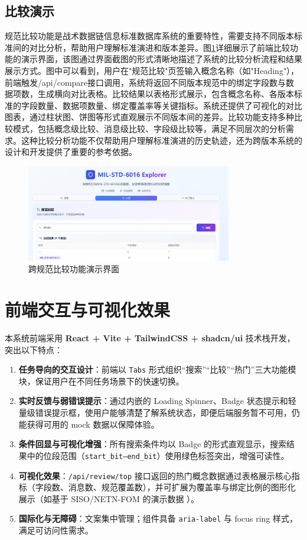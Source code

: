 \subsection{比较演示}
规范比较功能是战术数据链信息标准数据库系统的重要特性，需要支持不同版本标准间的对比分析，帮助用户理解标准演进和版本差异。图\ref{fig:compare-demo}详细展示了前端比较功能的演示界面，该图通过界面截图的形式清晰地描述了系统的比较分析流程和结果展示方式。图中可以看到，用户在"规范比较"页签输入概念名称（如"Heading"），前端触发/api/compare接口调用，系统将返回不同版本规范中的绑定字段数与数据项数，生成横向对比表格。比较结果以表格形式展示，包含概念名称、各版本标准的字段数量、数据项数量、绑定覆盖率等关键指标。系统还提供了可视化的对比图表，通过柱状图、饼图等形式直观展示不同版本间的差异。比较功能支持多种比较模式，包括概念级比较、消息级比较、字段级比较等，满足不同层次的分析需求。这种比较分析功能不仅帮助用户理解标准演进的历史轨迹，还为跨版本系统的设计和开发提供了重要的参考依据。

\begin{figure}[H]
  \centering
  \includegraphics[width=0.8\textwidth]{chapters/fig-0/frontend-compare-demo.png}
  \caption{跨规范比较功能演示界面}
  \label{fig:compare-demo}
\end{figure}


\section{前端交互与可视化效果}

本系统前端采用 \textbf{React + Vite + TailwindCSS + shadcn/ui} 技术栈开发，突出以下特点：
\begin{enumerate}
  \item \textbf{任务导向的交互设计}：前端以 \texttt{Tabs} 形式组织“搜索”“比较”“热门”三大功能模块，保证用户在不同任务场景下的快速切换。
  \item \textbf{实时反馈与弱错误提示}：通过内嵌的 Loading Spinner、Badge 状态提示和轻量级错误提示框，使用户能够清楚了解系统状态，即便后端服务暂不可用，仍能获得可用的 mock 数据以保障体验。
  \item \textbf{条件回显与可视化增强}：所有搜索条件均以 Badge 的形式直观显示，搜索结果中的位段范围（\texttt{start\_bit--end\_bit}）使用绿色标签突出，增强可读性。
  \item \textbf{可视化效果}：\texttt{/api/review/top} 接口返回的热门概念数据通过表格展示核心指标（字段数、消息数、规范覆盖数），并可扩展为覆盖率与绑定比例的图形化展示（如基于 SISO/NETN-FOM 的演示数据 \cite{SISO_STD_002_2006,AFMAN_13_116_Vol1_2020}）。
  \item \textbf{国际化与无障碍}：文案集中管理；组件具备 \texttt{aria-label} 与 focus ring 样式，满足可访问性需求。
\end{enumerate}


